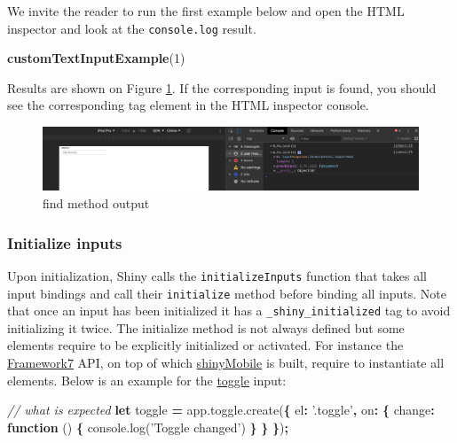 \documentclass[
]{book}
\newenvironment{Shaded}{\begin{snugshade}}{\end{snugshade}}
\newcommand{\AttributeTok}[1]{\textcolor[rgb]{0.77,0.63,0.00}{#1}}
\newcommand{\CommentTok}[1]{\textcolor[rgb]{0.56,0.35,0.01}{\textit{#1}}}
\newcommand{\DataTypeTok}[1]{\textcolor[rgb]{0.13,0.29,0.53}{#1}}
\newcommand{\DecValTok}[1]{\textcolor[rgb]{0.00,0.00,0.81}{#1}}
\newcommand{\KeywordTok}[1]{\textcolor[rgb]{0.13,0.29,0.53}{\textbf{#1}}}
\newcommand{\NormalTok}[1]{#1}
\newcommand{\OperatorTok}[1]{\textcolor[rgb]{0.81,0.36,0.00}{\textbf{#1}}}
\newcommand{\StringTok}[1]{\textcolor[rgb]{0.31,0.60,0.02}{#1}}
\newcommand{\VariableTok}[1]{\textcolor[rgb]{0.00,0.00,0.00}{#1}}
\begin{document}
We invite the reader to run the first example below and open the HTML inspector and look at the \texttt{console.log} result.

\begin{Shaded}
\begin{Highlighting}[]
\KeywordTok{customTextInputExample}\NormalTok{(}\DecValTok{1}\NormalTok{)}
\end{Highlighting}
\end{Shaded}

Results are shown on Figure \ref{fig:shiny-find-inputs-result}. If the corresponding input is found, you should see the corresponding tag element in the HTML inspector console.

\begin{figure}
\includegraphics[width=35.81in]{images/survival-kit/shiny-find-inputs-result} \caption{find method output}\label{fig:shiny-find-inputs-result}
\end{figure}

\hypertarget{initialize-inputs}{%
\subsubsection{Initialize inputs}\label{initialize-inputs}}

Upon initialization, Shiny calls the \texttt{initializeInputs} function that takes all input bindings and call their \texttt{initialize} method before binding all inputs. Note that once an input has been initialized it has a \texttt{\_shiny\_initialized} tag to avoid initializing it twice. The initialize method is not always defined but some elements require to be explicitly initialized or activated. For instance the \href{https://framework7.io}{Framework7} API, on top of which \href{https://github.com/RinteRface/shinyMobile}{shinyMobile} is built, require to instantiate all elements. Below is an example for the \href{https://framework7.io/docs/toggle.html}{toggle} input:

\begin{Shaded}
\begin{Highlighting}[]
\CommentTok{// what is expected}
\KeywordTok{let}\NormalTok{ toggle }\OperatorTok{=} \VariableTok{app}\NormalTok{.}\VariableTok{toggle}\NormalTok{.}\AttributeTok{create}\NormalTok{(}\OperatorTok{\{}
  \DataTypeTok{el}\OperatorTok{:} \StringTok{'.toggle'}\OperatorTok{,}
  \DataTypeTok{on}\OperatorTok{:} \OperatorTok{\{}
    \DataTypeTok{change}\OperatorTok{:} \KeywordTok{function}\NormalTok{ () }\OperatorTok{\{}
      \VariableTok{console}\NormalTok{.}\AttributeTok{log}\NormalTok{(}\StringTok{'Toggle changed'}\NormalTok{)}
    \OperatorTok{\}}
  \OperatorTok{\}}
\OperatorTok{\}}\NormalTok{)}\OperatorTok{;}
\end{Highlighting}
\end{Shaded}
\end{document}
